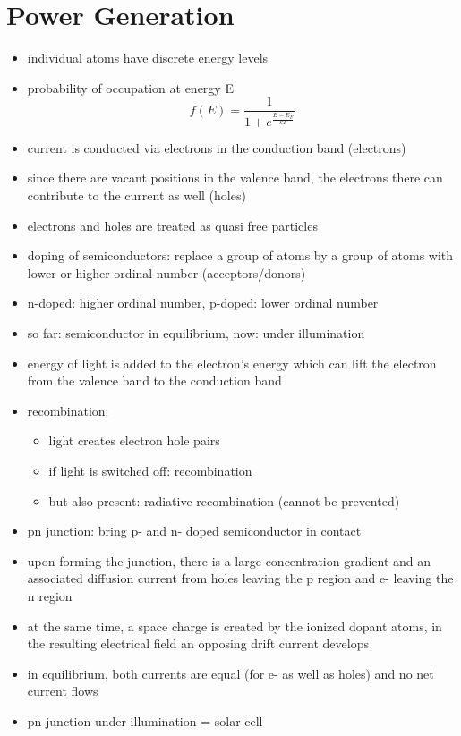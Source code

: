 \section{Power Generation}
\begin{itemize}
 \item individual atoms have discrete energy levels
 \item probability of occupation at energy E
 \[f(E) = \frac{1}{1+e^{\frac{E-E_F}{kT}}}\]
 \item current is conducted via electrons in the conduction band (electrons)
 \item since there are vacant positions in the valence band, the electrons there can contribute to the current as well (holes)
 \item electrons and holes are treated as quasi free particles
 \item doping of semiconductors: replace a group of atoms by a group of atoms with lower or higher ordinal number (acceptors/donors)
 \item n-doped: higher ordinal number, p-doped: lower ordinal number
 \item so far: semiconductor in equilibrium, now: under illumination
 \item energy of light is added to the electron's energy which can lift the electron from the valence band to the conduction band
 \item recombination:
 \begin{itemize}
  \item light creates electron hole pairs
  \item if light is switched off: recombination
  \item but also present: radiative recombination (cannot be prevented)
 \end{itemize}
 \item pn junction: bring p- and n- doped semiconductor in contact
 \item upon forming the junction, there is a large concentration gradient and an associated diffusion current from holes leaving the p region and e- leaving the n region
 \item at the same time, a space charge is created by the ionized dopant atoms, in the resulting electrical field an opposing drift current develops
 \item in equilibrium, both currents are equal (for e- as well as holes) and no net current flows
 \item pn-junction under illumination = solar cell

\end{itemize}
